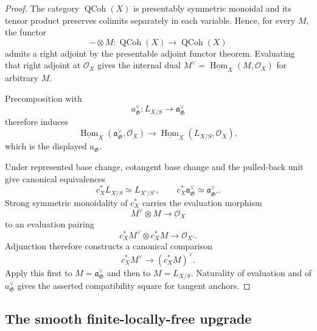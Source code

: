 \begin{proof}
The category $\operatorname{QCoh}(X)$ is presentably symmetric monoidal and
its tensor product preserves colimits separately in each variable.  Hence,
for every $M$, the functor
\[
    -\otimes M:
    \operatorname{QCoh}(X)\longrightarrow\operatorname{QCoh}(X)
\]
admits a right adjoint by the presentable adjoint functor theorem.  Evaluating
that right adjoint at $\mathcal O_X$ gives the internal dual
$M^\vee=\underline{\operatorname{Hom}}_X(M,\mathcal O_X)$ for arbitrary
$M$.

Precomposition with
\[
    a_{\mathfrak G}^{\vee}:
    L_{X/S}\longrightarrow\mathfrak a_{\mathfrak G}^{\vee}
\]
therefore induces
\[
    \underline{\operatorname{Hom}}_X
    (\mathfrak a_{\mathfrak G}^{\vee},\mathcal O_X)
    \longrightarrow
    \underline{\operatorname{Hom}}_X
    (L_{X/S},\mathcal O_X),
\]
which is the displayed $a_{\mathfrak G}$.

Under represented base change, cotangent base change and the pulled-back unit
give canonical equivalences
\[
    c_X^*L_{X/S}\simeq L_{X'/S'},
    \qquad
    c_X^*\mathfrak a_{\mathfrak G}^{\vee}
    \simeq
    \mathfrak a_{\mathfrak G'}^{\vee}.
\]
Strong symmetric monoidality of $c_X^*$ carries the evaluation morphism
\[
    M^\vee\otimes M\longrightarrow\mathcal O_X
\]
to an evaluation pairing
\[
    c_X^*M^\vee\otimes c_X^*M\longrightarrow\mathcal O_{X'}.
\]
Adjunction therefore constructs a canonical comparison
\[
    c_X^*M^\vee\longrightarrow(c_X^*M)^\vee.
\]
Apply this first to $M=\mathfrak a_{\mathfrak G}^{\vee}$ and then to
$M=L_{X/S}$.  Naturality of evaluation and of
$a_{\mathfrak G}^{\vee}$ gives the asserted compatibility square for tangent
anchors.
\end{proof}

\subsection{The smooth finite-locally-free upgrade}

